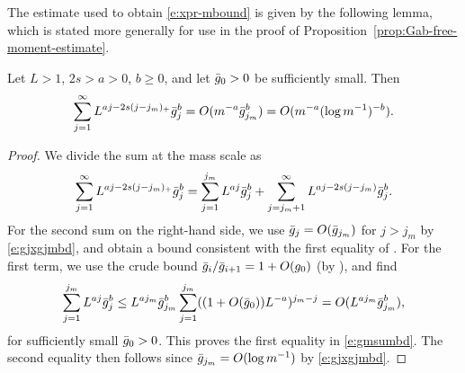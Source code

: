 The estimate used to obtain \eqref{e:xpr-mbound}
is given by the following lemma,
which is stated more generally for use
in the proof of Proposition~\ref{prop:Gab-free-moment-estimate}.

\begin{lemma} \label{lem:mass-scale-sum}
Let $L>1$, $2s> a > 0$, $b \geq 0$, and let $\bar{g}_0>0$ be sufficiently small.
Then
\begin{equation} \label{e:gmsumbd}
\sum_{j=1}^\infty L^{aj - 2s (j - j_m)_+}
\bar{g}_j^b = O(m^{-a} \bar{g}_{j_m}^b) = O(m^{-a} (\log m^{-1})^{-b}).
\end{equation}
\end{lemma}

\begin{proof}
We divide the sum at the mass scale as
\begin{equation} \label{e:xpr-2sums}
\sum_{j=1}^\infty L^{aj - 2s (j - j_m)_+} \bar{g}_j^{b}
= \sum_{j=1}^{j_m} L^{aj} \bar{g}_j^{b} +  \sum_{j=j_m+1}^\infty L^{aj - 2s (j - j_m)} \bar{g}_{j}^{b}.
\end{equation}
For the second sum on the right-hand side, we use $\bar{g}_j = O(\bar{g}_{j_m})$ for $j > j_m$
by \eqref{e:gjxgjmbd},
and obtain
a bound consistent with the first equality of .
For the first term, we use the crude bound
$\bar{g}_i/\bar{g}_{i+1} = 1+O(g_0)$ (by
\cite[Lemma~\ref{flow-lem:elementary-recursion}]{BBS-rg-flow}), and find
\begin{equation}
  \sum_{j=1}^{j_m} L^{aj} \bar{g}_j^b
  \leq
  L^{aj_m} \bar{g}_{j_m}^b
  \sum_{j=1}^{j_m} ((1+O(\bar{g}_0))L^{-a})^{j_m-j}
  =
  O(L^{aj_m} \bar{g}_{j_m}^b),
\end{equation}
for sufficiently small $\bar{g}_0>0$.
This proves the first equality in \eqref{e:gmsumbd}.
The second equality then follows since
$\bar{g}_{j_m} = O(\log m^{-1})$ by \eqref{e:gjxgjmbd}.
\end{proof}